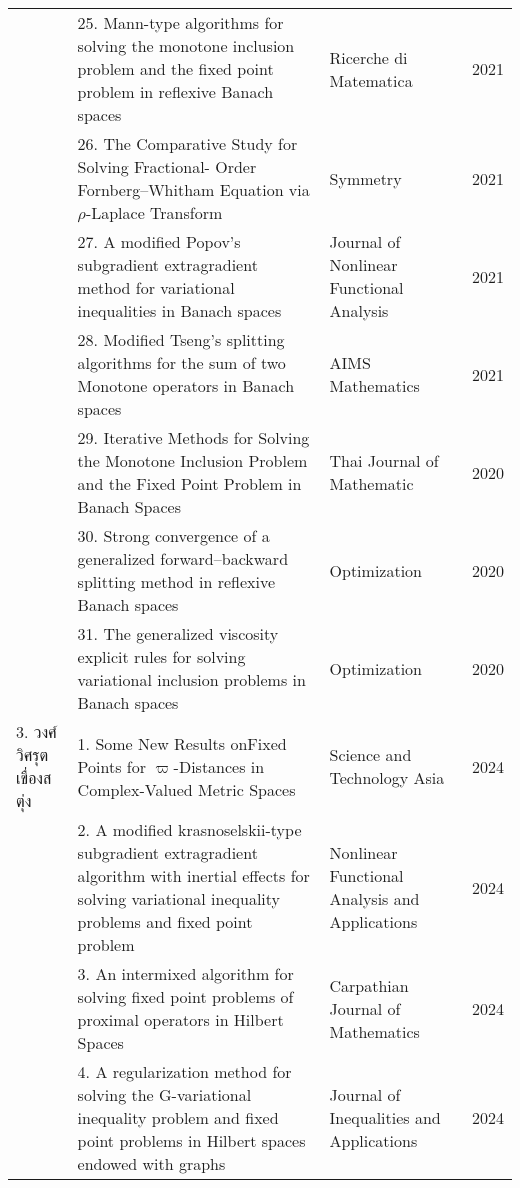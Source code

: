 {{\begin{center}
\begin{longtable}{|p{}|>{\raggedright}p{}|>{\raggedright}p{}|p{}|}
&25. Mann-type algorithms for 
solving the monotone 
inclusion problem and 
the fixed point problem 
in reflexive Banach spaces
&Ricerche di Matematica
&2021\\ \cline{2-4}

&26. The Comparative Study
for Solving Fractional-
Order Fornberg–Whitham 
Equation via $\rho$-Laplace
Transform		
&Symmetry
&2021\\ \cline{2-4}

&27. A modified Popov’s
subgradient extragradient 
method for variational 
inequalities in Banach 
spaces	 
&Journal of
Nonlinear Functional 
Analysis
&2021
\\ \cline{2-4}

&28. Modified Tseng’s 
splitting algorithms for
the sum of two 
Monotone operators 
in Banach spaces
&AIMS Mathematics
&2021 \\ \cline{2-4}

&29. Iterative Methods for Solving the Monotone
Inclusion Problem and the Fixed Point Problem
in Banach Spaces
&Thai Journal of 
Mathematic
&2020 
\\ \cline{2-4}		

&30. Strong convergence of a generalized forward–backward splitting
method in reflexive Banach spaces				
&Optimization
&2020 
\\ \cline{2-4}	

&31. The generalized viscosity explicit rules for solving variational inclusion
problems in Banach spaces
&Optimization
&2020 \\ \hline

3. วงศ์วิศรุต เขื่องสตุ่ง&
1. Some New Results on\newline Fixed Points for   $\varpi$-Distances in Complex-Valued Metric Spaces
&Science and Technology Asia&
2024 \\ \cline{2-4}

&2. A modified krasnoselskii-type subgradient extragradient algorithm with inertial effects for solving variational inequality problems and fixed point problem
&Nonlinear Functional Analysis and Applications &
2024 \\ \cline{2-4}

&3. An intermixed algorithm for solving fixed point problems of proximal operators in Hilbert Spaces
&Carpathian 
Journal of 
Mathematics &
2024 \\ \cline{2-4}

&4. A regularization method for solving the G-variational inequality problem and fixed point problems in Hilbert spaces endowed with graphs
&Journal of Inequalities and Applications &
2024 \\ \cline{2-4}


\end{longtable}
\end{center}}}

